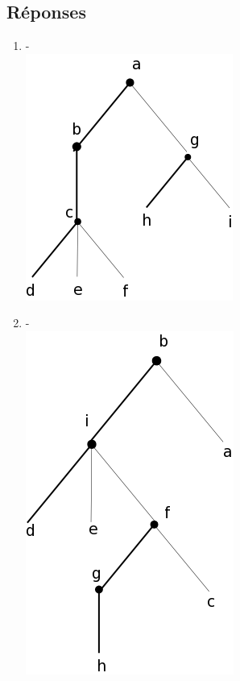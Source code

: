 \documentclass[a4paper, 11pt]{article}
\begin{document}
\subsection{Réponses}
\begin{enumerate}
    \item -\\ \includegraphics[scale=0.3]{reponse1.png}
    \item -\\ \includegraphics[scale=0.3]{reponse2.png}

\end{enumerate}
\end{document}
